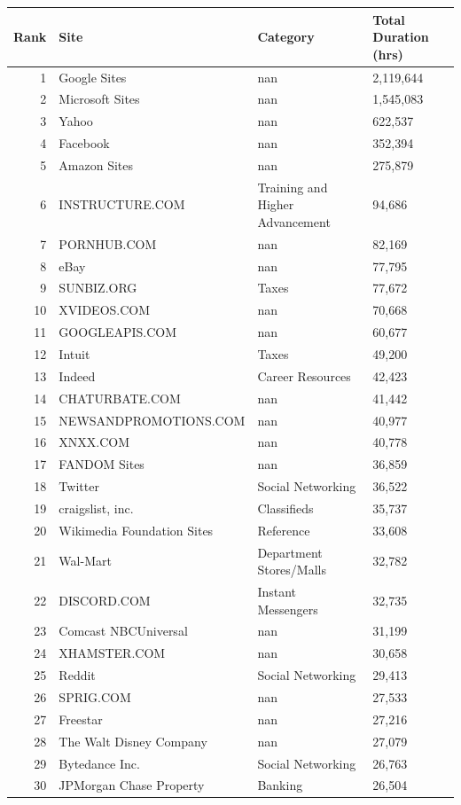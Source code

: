 \begin{tabular}{rlll}
\toprule
  Rank & Site & Category & Total Duration (hrs) \\
\midrule
  1 & Google Sites & nan & 2,119,644 \\
  2 & Microsoft Sites & nan & 1,545,083 \\
  3 & Yahoo & nan & 622,537 \\
  4 & Facebook & nan & 352,394 \\
  5 & Amazon Sites & nan & 275,879 \\
  6 & INSTRUCTURE.COM & Training and Higher Advancement & 94,686 \\
  7 & PORNHUB.COM & nan & 82,169 \\
  8 & eBay & nan & 77,795 \\
  9 & SUNBIZ.ORG & Taxes & 77,672 \\
  10 & XVIDEOS.COM & nan & 70,668 \\
  11 & GOOGLEAPIS.COM & nan & 60,677 \\
  12 & Intuit & Taxes & 49,200 \\
  13 & Indeed & Career Resources & 42,423 \\
  14 & CHATURBATE.COM & nan & 41,442 \\
  15 & NEWSANDPROMOTIONS.COM & nan & 40,977 \\
  16 & XNXX.COM & nan & 40,778 \\
  17 & FANDOM Sites & nan & 36,859 \\
  18 & Twitter & Social Networking & 36,522 \\
  19 & craigslist, inc. & Classifieds & 35,737 \\
  20 & Wikimedia Foundation Sites & Reference & 33,608 \\
  21 & Wal-Mart & Department Stores/Malls & 32,782 \\
  22 & DISCORD.COM & Instant Messengers & 32,735 \\
  23 & Comcast NBCUniversal & nan & 31,199 \\
  24 & XHAMSTER.COM & nan & 30,658 \\
  25 & Reddit & Social Networking & 29,413 \\
  26 & SPRIG.COM & nan & 27,533 \\
  27 & Freestar & nan & 27,216 \\
  28 & The Walt Disney Company & nan & 27,079 \\
  29 & Bytedance Inc. & Social Networking & 26,763 \\
  30 & JPMorgan Chase Property & Banking & 26,504 \\

\end{tabular}
